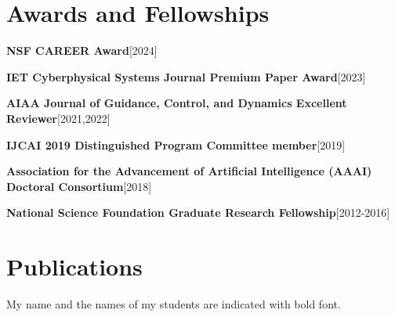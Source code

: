\documentclass[10pt,roman]{moderncv}
\newcommand{\mycvitem}[2]{
    \textbf{#2}\hfill [#1]\break
}
\begin{document}
\section{Awards and Fellowships}

\mycvitem{2024}{NSF CAREER Award}
\mycvitem{2023}{IET Cyberphysical Systems Journal Premium Paper Award}
\mycvitem{2021,2022}{AIAA Journal of Guidance, Control, and Dynamics Excellent Reviewer}
\mycvitem{2019}{IJCAI 2019 Distinguished Program Committee member}
\mycvitem{2018}{Association for the Advancement of Artificial Intelligence (AAAI) Doctoral Consortium}
\mycvitem{2012-2016}{National Science Foundation Graduate Research Fellowship}


% 

\clearpage
\section{Publications}

\renewcommand{\thejnum}{J\arabic{jnum}}
\newcommand{\journal}[1]{\refstepcounter{jnum}\item[{[\thejnum]}] \fullcite{#1}\par\label{#1}}
\renewcommand{\thejcnum}{JC\arabic{jcnum}}
\newcommand{\jc}[1]{\refstepcounter{jcnum}\item[{[\thejcnum]}] \fullcite{#1}\par\label{#1}}
\renewcommand{\thecnum}{C\arabic{cnum}}
\newcommand{\conf}[1]{\refstepcounter{cnum}\item[{[\thecnum]}] \fullcite{#1}\par\label{#1}}
\renewcommand{\theonum}{A\arabic{onum}}
\newcommand{\opub}[1]{\refstepcounter{onum}\item[{[\theonum]}] \fullcite{#1}\par\label{#1}}

My name and the names of my students are indicated with bold font.
\vspace{1em}
\end{document}
